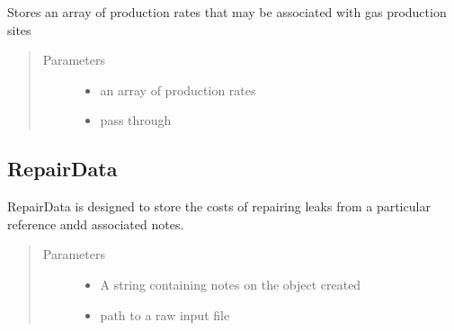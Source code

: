 \documentclass[letterpaper,10pt,english]{sphinxmanual}
\begin{document}
\begin{fulllineitems}
\label{\detokenize{index:feast.input_data_classes.ProductionData}}
Stores an array of production rates that may be associated with gas production sites
\begin{quote}\begin{description}
\item[{Parameters}] \leavevmode\begin{itemize}
\item {} 
 \textendash{} an array of production rates

\item {} 
 \textendash{} pass through

\end{itemize}

\end{description}\end{quote}

\end{fulllineitems}



\subsection{RepairData}
\label{\detokenize{index:repairdata}}

\begin{fulllineitems}
\label{\detokenize{index:feast.input_data_classes.RepairData}}
RepairData is designed to store the costs of repairing leaks from a particular reference andd associated notes.
\begin{quote}\begin{description}
\item[{Parameters}] \leavevmode\begin{itemize}
\item {} 
 \textendash{} A string containing notes on the object created

\item {} 
 \textendash{} path to a raw input file

\end{itemize}

\end{description}\end{quote}

\end{fulllineitems}
\end{document}
